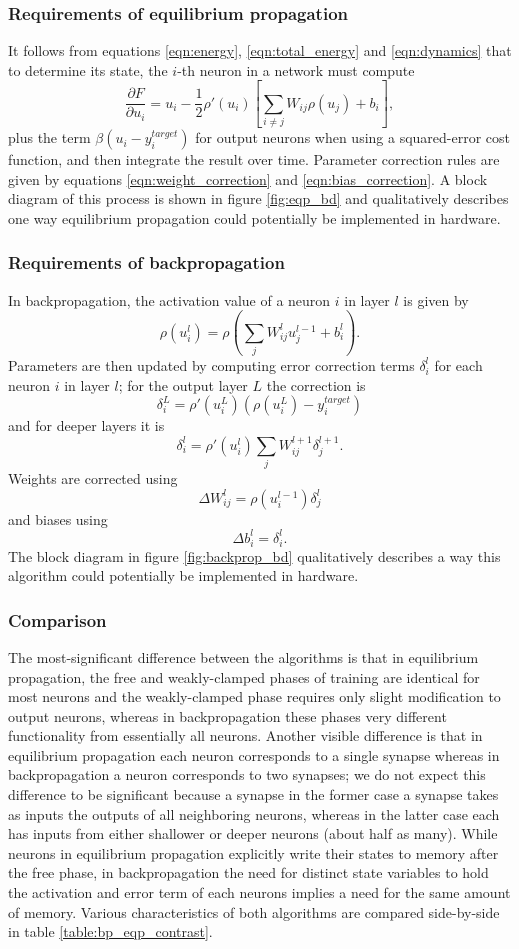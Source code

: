 \documentclass[utf8]{frontiersSCNS}
\begin{document}
\subsubsection{Requirements of equilibrium propagation}


It follows from equations \ref{eqn:energy}, \ref{eqn:total_energy} and \ref{eqn:dynamics} that to determine its state, the $i$-th neuron in a network must compute $$\frac{\partial F}{\partial u_i}=u_i-\frac{1}{2}\rho'(u_i)[\sum_{i\neq j}W_{ij}\rho(u_j)+b_i],$$ plus the term $\beta(u_i-y_i^{target})$ for output neurons when using a squared-error cost function, and then integrate the result over time. Parameter correction rules are given by equations \ref{eqn:weight_correction} and \ref{eqn:bias_correction}. A block diagram of this process is shown in figure \ref{fig:eqp_bd} and qualitatively describes one way equilibrium propagation could potentially be implemented in hardware.

\subsubsection{Requirements of backpropagation}

In backpropagation, the activation value of a neuron $i$ in layer $l$ is given by $$\rho(u_i^l)=\rho(\sum_jW_{ij}^lu_j^{l-1}+b_i^l).$$ Parameters are then updated by computing error correction terms $\delta_i^l$ for each neuron $i$ in layer $l$; for the output layer $L$ the correction is $$\delta_i^L=\rho'(u_i^L)(\rho(u_i^L)-y_i^{target})$$ and for deeper layers it is $$\delta_i^l=\rho'(u_i^l)\sum_jW_{ij}^{l+1}\delta_j^{l+1}.$$ Weights are corrected using $$\Delta W_{ij}^l=\rho(u_i^{l-1})\delta_j^l$$ and biases using $$\Delta b_i^l=\delta_i^l.$$ The block diagram in figure \ref{fig:backprop_bd} qualitatively describes a way this algorithm could potentially be implemented in hardware.

\subsubsection{Comparison}

The most-significant difference between the algorithms is that in equilibrium propagation, the free and weakly-clamped phases of training are identical for most neurons and the weakly-clamped phase requires only slight modification to output neurons, whereas in backpropagation these phases very different functionality from essentially all neurons. Another visible difference is that in equilibrium propagation each neuron corresponds to a single synapse whereas in backpropagation a neuron corresponds to two synapses; we do not expect this difference to be significant because a synapse in the former case a synapse takes as inputs the outputs of all neighboring neurons, whereas in the latter case each has inputs from either shallower or deeper neurons (about half as many). While neurons in equilibrium propagation explicitly write their states to memory after the free phase, in backpropagation the need for distinct state variables to hold the activation and error term of each neurons implies a need for the same amount of memory. Various characteristics of both algorithms are compared side-by-side in table \ref{table:bp_eqp_contrast}.
\end{document}
